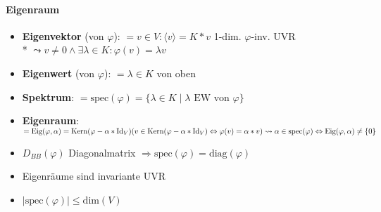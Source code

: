 \paragraph{Eigenraum}
\begin{itemize}
	\item \textbf{Eigenvektor} (von $\varphi$): $= v \in V: \langle v \rangle = K * v$ 1-dim. $\varphi$-inv. UVR \\* $\leadsto v \neq 0 \wedge \exists \lambda \in K: \varphi(v)=\lambda v$
	\item \textbf{Eigenwert} (von $\varphi$): $= \lambda \in K$ von oben
	\item \textbf{Spektrum}: $= \text{spec}(\varphi) = \{ \lambda \in K \mid \lambda \text{ EW von } \varphi \}$
	\item \textbf{Eigenraum}: $= \text{Eig}(\varphi, \alpha)= \text{Kern}(\varphi - \alpha * \text{Id}_V) \\* (v \in \text{Kern}(\varphi - \alpha * \text{Id}_V) \Leftrightarrow \varphi(v) = \alpha*v) \\* \leadsto \alpha \in \text{spec}(\varphi) \Leftrightarrow \text{Eig}(\varphi, \alpha) \neq \{ 0 \}$
	\item $D_{BB}(\varphi)$ Diagonalmatrix $\Rightarrow \text{spec}(\varphi) = \text{diag}(\varphi)$
	\item Eigenräume sind invariante UVR
	\item $| \text{spec}(\varphi) | \leq \text{dim}(V)$
\end{itemize}

